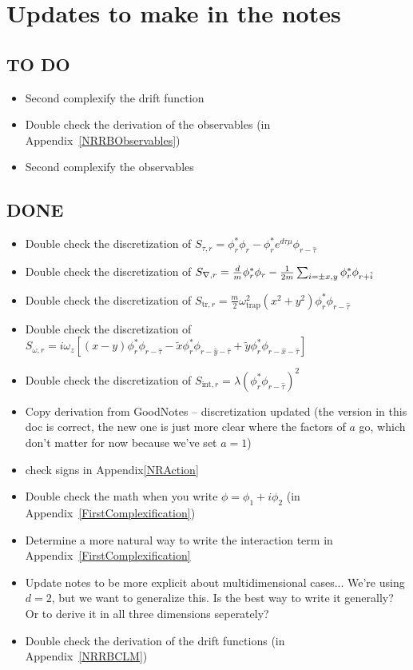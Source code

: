 \documentclass[../RotatingBosons.tex]{subfiles}
\begin{document}
\section{Updates to make in the notes}
\subsection{TO DO}
\begin{itemize}
	\item Second complexify the drift function
	\item Double check the derivation of the observables (in Appendix~\ref{NRRBObservables})
	\item Second complexify the observables
\end{itemize}

\subsection{DONE}
\begin{itemize}
	\item Double check the discretization of $S_{\tau, r}  =  \phi^{*}_{r}\phi_{r}- \phi^{*}_{r}e^{d \tau \mu} \phi_{r - \hat{\tau}} $
	\item Double check the discretization of $S_{{\nabla}, r}  =  \frac{d}{m} \phi^{*}_{r}\phi_{r} - \frac{1}{2m}\sum_{i = \pm x,y} \phi^{*}_{r}\phi_{r+\hat{i}}$
	\item Double check the discretization of $S_{\mathrm{tr},r} = \frac{m}{2}\omega_{\text{trap}}^{2}(x^{2}+y^{2})\phi_{r}^{*}\phi_{r-\hat{\tau}}$
	\item Double check the discretization of $S_{\omega, r} =  i \omega_{z} \left[ (x-y)\phi_{r}^{*}  \phi_{r-\hat{\tau}} - \widetilde{x} \phi_{r}^{*} \phi_{r-\hat{y}-\hat{\tau}} + \widetilde{y} \phi_{r}^{*}  \phi_{r-\hat{x}-\hat{\tau}} \right] $
	\item Double check the discretization of $S_{\text{int}, r} = \lambda \left(\phi_{r}^{*} \phi_{r-\hat{\tau}}\right)^{2}$	
	\item Copy derivation from GoodNotes -- discretization updated (the version in this doc is correct, the new one is just more clear where the factors of $a$ go, which don't matter for now because we've set $a = 1$)
	\item check signs in Appendix\ref{NRAction}
	\item Double check the math when you write $\phi = \phi_{1} + i\phi_{2}$ (in Appendix~\ref{FirstComplexification})
	\item Determine a more natural way to write the interaction term in Appendix~\ref{FirstComplexification}
	\item Update notes to be more explicit about multidimensional cases... We're using $d=2$, but we want to generalize this. Is the best way to write it generally? Or to derive it in all three dimensions seperately?
	\item Double check the derivation of the drift functions (in Appendix~\ref{NRRBCLM}) 
\end{itemize}
\end{document}

